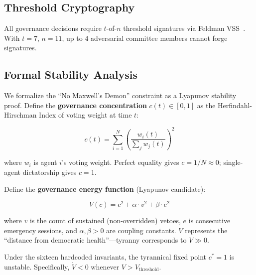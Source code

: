\documentclass[11pt,a4paper]{article}
\begin{document}
\subsection{Threshold Cryptography}

All governance decisions require $t$-of-$n$ threshold signatures via Feldman VSS~\cite{feldman}. With $t=7$, $n=11$, up to 4 adversarial committee members cannot forge signatures.

\subsection{Formal Stability Analysis}
\label{sec:lyapunov}

We formalize the ``No Maxwell's Demon'' constraint as a Lyapunov stability proof. Define the \textbf{governance concentration} $c(t) \in [0, 1]$ as the Herfindahl-Hirschman Index of voting weight at time $t$:

\begin{equation}
    c(t) = \sum_{i=1}^{N} \left(\frac{w_i(t)}{\sum_j w_j(t)}\right)^2
    \label{eq:hhi}
\end{equation}

\noindent where $w_i$ is agent $i$'s voting weight. Perfect equality gives $c = 1/N \approx 0$; single-agent dictatorship gives $c = 1$.

Define the \textbf{governance energy function} (Lyapunov candidate):

\begin{equation}
    V(c) = c^2 + \alpha \cdot v^2 + \beta \cdot e^2
    \label{eq:lyapunov}
\end{equation}

\noindent where $v$ is the count of sustained (non-overridden) vetoes, $e$ is consecutive emergency sessions, and $\alpha, \beta > 0$ are coupling constants. $V$ represents the ``distance from democratic health''---tyranny corresponds to $V \gg 0$.

\begin{theorem}
Under the sixteen hardcoded invariants, the tyrannical fixed point $c^* = 1$ is unstable. Specifically, $\dot{V} < 0$ whenever $V > V_{\text{threshold}}$.
\end{theorem}
\end{document}
